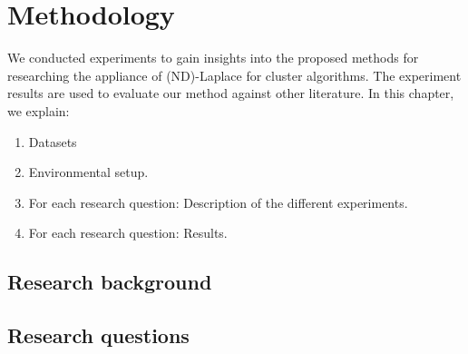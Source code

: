 \chapter{Methodology}

We conducted experiments to gain insights into the proposed methods for researching the appliance of (ND)-Laplace for cluster algorithms.
The experiment results are used to evaluate our method against other literature.
In this chapter, we explain:
\begin{enumerate}

  \item Datasets
  \item Environmental setup.
  \item For each research question: Description of the different experiments.
  \item For each research question: Results.
\end{enumerate}

\section{Research background}
\section{Research questions}

